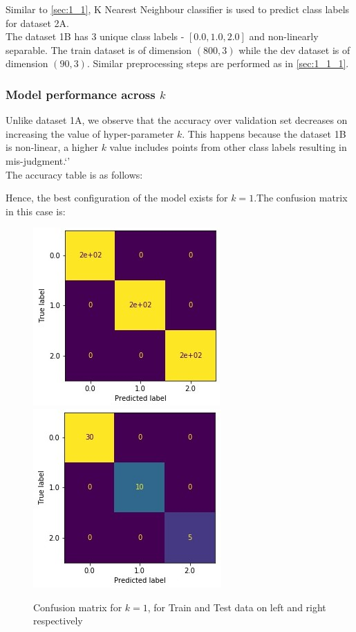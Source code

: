 \documentclass[11pt,a4paper]{article}
\newcommand{\noi}{\noindent}
\begin{document}
Similar to \autoref{sec:1_1}, K Nearest Neighbour classifier is used to predict class labels for dataset 2A. \\

\noi
The dataset 1B has 3 unique class labels - $[0.0, 1.0, 2.0]$ and non-linearly separable. The train dataset is of dimension $(800,3)$ while the dev dataset is of dimension $(90,3)$. Similar preprocessing steps are performed as in \autoref{sec:1_1_1}.

\subsubsection{Model performance across $k$}
Unlike dataset 1A, we observe that the accuracy over validation set decreases on increasing the value of hyper-parameter $k$. This happens because the dataset 1B is non-linear, a higher $k$ value includes points from other class labels resulting in mis-judgment.`'\\

\noi
The accuracy table is as follows:


\noi 
Hence, the best configuration of the model exists for $k=1$.The confusion matrix in this case is:

\begin{figure}[H]
    \centering
    \includegraphics[scale=0.85]{images/1b_cm_KNN_train.jpg}
    \includegraphics[scale=0.85]{images/1b_cm_KNN_test.jpg}
    \caption{Confusion matrix for $k=1$, for Train and Test data on left and right respectively }
    \label{fig:1b_cm_KNN}
\end{figure}
\end{document}
